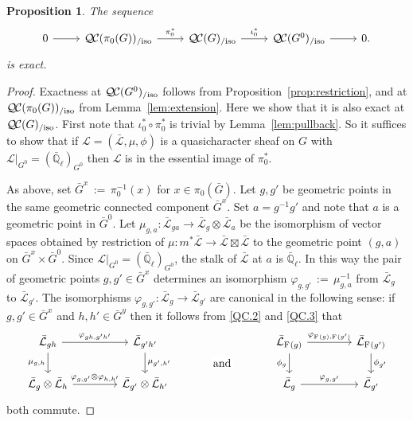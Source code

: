 \documentclass[10pt]{amsart}
\theoremstyle{plain}
\newtheorem{proposition}[theorem]{Proposition}
\theoremstyle{definition}
\theoremstyle{remark}
\newcommand{\EE}{\mathbb{\bar Q}_\ell}
\newcommand{\Frob}[1]{\operatorname{F}_{#1}}
\newcommand{\ceq}{{\, :=\, }}
\newcommand{\qcs}[1]{{\mathcal{#1}}}
\newcommand{\gqcs}[1]{{\mathcal{\bar #1}}}
\newcommand{\QC}{{\mathcal{Q\hskip-0.8pt C}}}
\newcommand{\QCiso}[1]{\QC(#1)_{/\text{iso}}}
\newcommand{\bG}{\bar{G}}
\begin{document}
\begin{proposition}\label{prop:middleexact}
 The sequence
 \[
  \begin{tikzcd}
  0 \rar & \QCiso{\pi_0(G)} \arrow{r}{\pi_0^*} & \QCiso{G} \arrow{r}{\iota_0^*} & \QCiso{G^0} \rar & 0.
  \end{tikzcd}
 \]
 is exact.
\end{proposition}

\begin{proof}
Exactness at $\QCiso{G^0}$ follows from Proposition~\ref{prop:restriction},
and at $\QCiso{\pi_0(G)}$ from Lemma~\ref{lem:extension}.
Here we show that it is also exact at $\QCiso{G}$.
First note that $\iota_0^* \circ \pi_0^*$ is trivial by Lemma~\ref{lem:pullback}.
So it suffices to show that if $\qcs{L} = (\gqcs{L},\mu,\phi)$ is a quasicharacter sheaf on $G$
with $\qcs{L}\vert_{G^0} = (\EE)_{G^0}$ then $\qcs{L}$ is in the essential image of $\pi_0^*$.

As above, set $\bG^x \ceq \pi_0^{-1}(x)$ for $x\in \pi_0(\bG)$.
Let $g, g'$ be geometric points in the same
geometric connected component $\bG^x$.
Set $a = g^{-1}g'$ and note that $a$ is a geometric point in $\bG^0$.
Let $\mu_{g,a} : \gqcs{L}_{ga} \to \gqcs{L}_g \otimes \gqcs{L}_a$
be the isomorphism of vector spaces obtained by restriction of
$\mu : m^*\gqcs{L} \to \gqcs{L} \boxtimes \gqcs{L}$ to the
geometric point $(g,a)$ on $\bG^x \times \bG^0$.
Since $\qcs{L}\vert_{G^0} = (\EE)_{G^0}$,
the stalk of $\gqcs{L}$ at $a$ is $\EE$.
In this way the pair of geometric points $g, g' \in \bG^x$
determines an isomorphism $\varphi_{g,g'} \ceq \mu_{g,a}^{-1}$
from $\gqcs{L}_{g}$ to $\gqcs{L}_{g'}$.
%
The isomorphisms $\varphi_{g,g'}: \gqcs{L}_{g} \to \gqcs{L}_{g'}$ are canonical
in the following sense: if $g,g'\in \bG^x$ and $h,h'\in \bG^y$
then it follows from \ref{QC.2} and \ref{QC.3}
that
 \begin{equation}\label{eq:qc}
  \begin{tikzcd}[column sep=40]
   \gqcs{L}_{gh} \arrow{r}{\varphi_{gh,g'h'}} \arrow[swap]{d}{\mu_{g,h}}
  & \gqcs{L}_{g'h'} \arrow{d}{\mu_{g',h'}}
  &\arrow[draw=none]{d}[pos=.4,description]{\text{\normalsize{and}}}
  &  \gqcs{L}_{\Frob{}(g)} \arrow{r}{\varphi_{\Frob{}(g),\Frob{}(g')}} \arrow[swap]{d}{\phi_{g}} & \gqcs{L}_{\Frob{}(g')} \arrow{d}{\phi_{g'}} \\
  \gqcs{L}_{g} \otimes \gqcs{L}_{h} \arrow{r}{\varphi_{g,g'}\otimes \varphi_{h,h'}}
  & \gqcs{L}_{g'} \otimes \gqcs{L}_{h'}
  & {}
  & \gqcs{L}_{g} \arrow{r}{\varphi_{g,g'}} & \gqcs{L}_{g'}
  \end{tikzcd}
 \end{equation}
both commute.


\end{proof}
\end{document}
